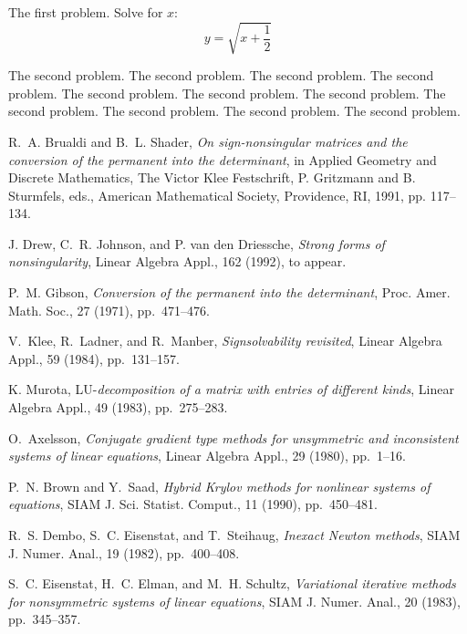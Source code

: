 \documentclass{SIAMGHbook2016}
\begin{document}
\begin{exercises}
\item The first problem. Solve for $x$:
\[
y=\sqrt{x + \displaystyle\frac{1}{2}}
\]

\item The second problem. The second problem. The second problem. The second problem.
The second problem. The second problem. The second problem. The second problem.
The second problem. The second problem. The second problem.
\end{exercises}



\backmatter

\begin{thebibliography}{10}
 {\sc R.~A. Brualdi and B.~L. Shader},
{\em On sign-nonsingular matrices and the conversion of the
permanent into the determinant}, in Applied Geometry and
Discrete Mathematics, The Victor Klee Festschrift, P.
Gritzmann and B. Sturmfels, eds., American Mathematical
Society, Providence, RI, 1991, pp. 117--134.

 {\sc J. Drew, C.~R. Johnson, and P. van den Driessche},
{\em Strong forms of nonsingularity}, Linear Algebra Appl.,
162 (1992), to appear.

 {\sc P.~M. Gibson}, {\em Conversion of the permanent into the
determinant}, Proc. Amer. Math. Soc., 27 (1971),
pp.~471--476.

{\sc V.~Klee, R.~Ladner, and R.~Manber}, {\it
Signsolvability revisited}, Linear Algebra Appl., 59
(1984), pp.~131--157.

{\sc K. Murota}, LU-{\em decomposition of a matrix with
entries of different kinds}, Linear Algebra Appl., 49
(1983), pp.~275--283.

{\sc O.~Axelsson}, {\em Conjugate gradient type methods for unsymmetric and
  inconsistent systems of linear equations}, Linear Algebra Appl., 29 (1980),
  pp.~1--16.

{\sc P.~N. Brown and Y.~Saad}, {\em Hybrid {K}rylov methods for nonlinear
  systems of equations}, SIAM J. Sci. Statist. Comput., 11 (1990),
  pp.~450--481.

{\sc R.~S. Dembo, S.~C. Eisenstat, and T.~Steihaug}, {\em Inexact {N}ewton
  methods}, SIAM J. Numer. Anal., 19 (1982), pp.~400--408.

{\sc S.~C. Eisenstat, H.~C. Elman, and M.~H. Schultz}, {\em Variational
  iterative methods for nonsymmetric systems of linear equations}, SIAM J.
  Numer. Anal., 20 (1983), pp.~345--357.


\end{thebibliography}
\end{document}
